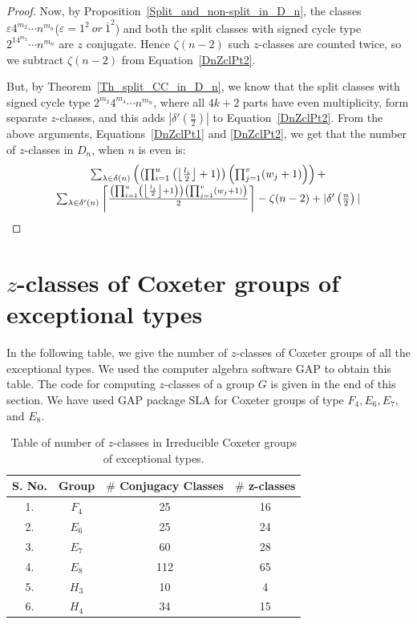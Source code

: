 \documentclass[12pt,twoside,reqno]{amsart}
\theoremstyle{definition}
\numberwithin{equation}{section}
\begin{document}
\begin{proof}
 Now, by Proposition~\ref{Split_and_non-split_in_D_n}, the classes $\varepsilon4^{m_2}\cdots n^{m_n}$($\varepsilon = 1^2 ~or~\overline{1}^2$) and both the split classes with signed cycle type $2^14^{m_2}\cdots n^{m_n}$ are $z$ conjugate. Hence $\zeta(n-2)$ such $z$-classes are counted twice, so we subtract $\zeta(n-2)$ from Equation~\ref{DnZclPt2}. 
 
 But, by  Theorem~\ref{Th_split_CC_in_D_n}, we know that the split classes with signed cycle type $2^{m_2}4^{m_4}\cdots n^{m_n}$, where all $4k + 2$ parts have even multiplicity, form separate $z$-classes, and this adds $|\delta'\left(\frac{n}{2}\right)|$ to Equation~\ref{DnZclPt2}. From the above arguments, Equations~\ref{DnZclPt1} and \ref{DnZclPt2}, we get that the number of $z$-classes in $D_n$, when $n$ is even is:
 $$\begin{matrix}\sum_{{\bf \lambda} \in \delta(n) }\left( \left(\prod_{i=1}^u \left(\left\lfloor \frac{l_i}{2}\right\rfloor + 1\right)\right)\left(\prod_{j=1}^v (w_j+1)\right)\right)+\\ \sum_{{\bf \lambda} \in \delta^\prime(n) }\left\lceil \frac{\left(\prod_{i=1}^u \left(\left\lfloor \frac{l_i}{2}\right\rfloor + 1\right)\right)\left(\prod_{j=1}^v (w_j+1)\right)}{2}\right\rceil-\zeta(n-2)+|\delta^\prime\left(\frac{n}{2}\right)|\end{matrix}$$
 
 \end{proof}


\section{$z$-classes of Coxeter groups of exceptional types}\label{z-classes_of_exceptional_types}
In the following table, we give the number of $z$-classes of Coxeter groups of all the exceptional types. We used the computer algebra software GAP to obtain this table. The code for computing $z$-classes of a group $G$ is given in the end of this section. We have used GAP package SLA \cite{SLA} for Coxeter groups of type $F_4, E_6, E_7,$ and $E_8.$

\begin{center}
\begin{table}
\caption{Table of number of $z$-classes in Irreducible Coxeter groups of exceptional types.}\label{Table-exceptional}
\begin{tabular}{|c|c|c|c|}
\hline
S. No. & Group & $\#$ Conjugacy Classes & $\#$ z-classes \\
\hline
1. & $F_4$ & 25 & 16\\
\hline
2. & $E_6$ & 25 & 24\\
\hline
3. & $E_7$ & 60 & 28\\
\hline
4. & $E_8$ & 112 & 65\\
\hline
5. & $H_3$ & 10 & 4 \\
\hline
6. & $H_4$ & 34 & 15\\
\hline
\end{tabular}
\end{table}
\end{center}
\end{document}

